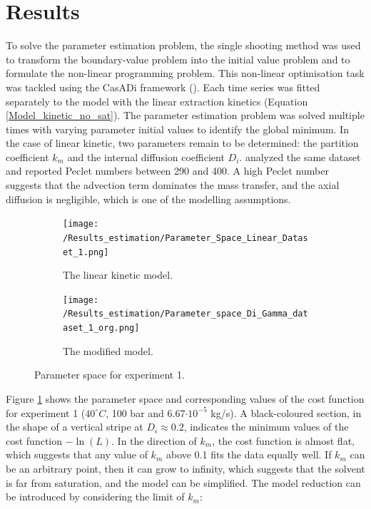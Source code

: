 \documentclass[a4paper,fleqn]{cas-dc}
\begin{document}
				
				\section{Results}
				
				\label{CH: Results}
				
				To solve the parameter estimation problem, the single shooting method was used to transform the boundary-value problem into the initial value problem and to formulate the non-linear programming problem. This non-linear optimisation task was tackled using the CasADi framework (\citet{Andersson2018}). Each time series was fitted separately to the model with the linear extraction kinetics (Equation \ref{Model_kinetic_no_sat}). The parameter estimation problem was solved multiple times with varying parameter initial values to identify the global minimum. In the case of linear kinetic, two parameters remain to be determined: the partition coefficient $k_m$ and the internal diffusion coefficient $D_i$. \citet{Rahimi2011} analyzed the same dataset and reported Peclet numbers between 290 and 400. A high Peclet number suggests that the advection term dominates the mass transfer, and the axial diffusion is negligible, which is one of the modelling assumptions.
				
				\begin{figure}[!h]
					\centering
					\begin{subfigure}{0.9\columnwidth}
						\centering
						\texttt{[image: /Results\_estimation/Parameter\_Space\_Linear\_Dataset\_1.png]}
						\caption{The linear kinetic model.}
						\label{fig: Fit_1_linear}
					\end{subfigure}
					\hfill
					\begin{subfigure}{0.9\columnwidth}
						\centering
						\texttt{[image: /Results\_estimation/Parameter\_space\_Di\_Gamma\_dataset\_1\_org.png]}
						\caption{The modified model.}
						\label{fig: Fit_1_Di_Gamma}
					\end{subfigure}
					\caption{Parameter space for experiment 1.}
				\end{figure}
				
				Figure \ref{fig: Fit_1_linear} shows the parameter space and corresponding values of the cost function for experiment 1 ($40^\circ C$, 100 bar and 6.67$\cdot 10^{-5}$ kg/s). A black-coloured section, in the shape of a vertical stripe at $D_i \approx 0.2$, indicates the minimum values of the cost function $-\ln(L)$. In the direction of $k_m$, the cost function is almost flat, which suggests that any value of $k_m$ above 0.1 fits the data equally well. If $k_m$ can be an arbitrary point, then it can grow to infinity, which suggests that the solvent is far from saturation, and the model can be simplified. The model reduction can be introduced by considering the limit of $k_m$:
				
\end{document}
